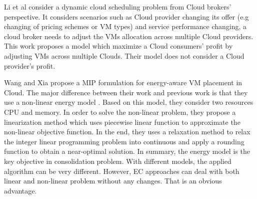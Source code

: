 Li et al \cite{Li:2011ti} consider a dynamic cloud scheduling problem 
from Cloud brokers' perspective. It considers scenarios such as Cloud provider changing its offer 
(e.g changing of pricing schemes or VM types) and service performance changing, 
a cloud broker needs to adjust the VMs allocation across multiple Cloud providers. 
This work proposes a model which maximize a Cloud consumers' profit by adjusting VMs across
multiple Clouds. Their model does not consider a Cloud provider's profit.

Wang and Xia \cite{Wang:2016ui} propose a MIP formulation for energy-aware VM placement in Cloud.
The major difference between their work and previous work is that they use a non-linear energy model \cite{Gandhi:2009wp}.  Based on this model, they consider two resources CPU and memory. In order to solve the non-linear problem, they propose a linearization method which uses piecewise linear function to approximate the non-linear objective function. In the end, they uses a relaxation method to relax the integer linear programming problem into continuous and apply a rounding function to obtain a near-optimal solution. In summary, the energy model is the key objective in consolidation problem. With different models, the applied algorithm can be very different. However, EC approaches can deal with both linear and non-linear problem without any changes. That is an obvious advantage. 



